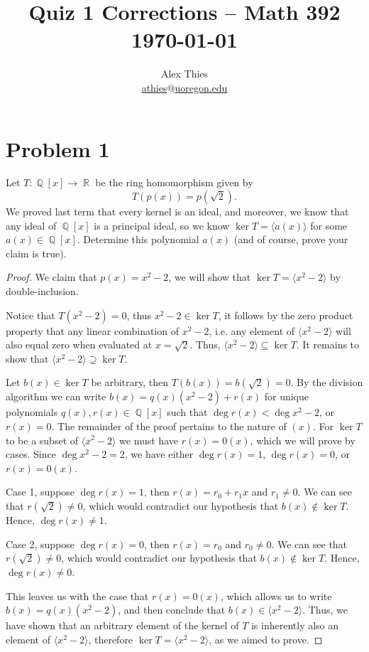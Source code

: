 \documentclass[letterpaper, 12pt]{amsart}
\DeclareMathOperator{\Q}{\mathbb{Q}}
\DeclareMathOperator{\R}{\mathbb{R}}
\newcommand{\pid}[1]{\langle #1 \rangle}
\begin{document}
	\title{Quiz 1 Corrections  -- Math 392 \\ \today}
	\author{Alex Thies \\ \href{mailto:athies@uoregon.edu}{\lowercase{athies$@$uoregon.edu}}}

	\maketitle

	\section*{Problem 1}
	\label{sec:problem_1}
	Let $T : \Q[x] \to \R$ be the ring homomorphism given by $$T(p(x)) = p(\sqrt{2}).$$
	We proved last term that every kernel is an ideal, and moreover, we know that any ideal of $\Q[x]$ is a principal ideal, so we know $\ker{T} = \pid{a(x)}$ for some $a(x) \in \Q[x]$.
	Determine this polynomial $a(x)$ (and of course, prove your claim is true).

	\begin{proof}
	We claim that $p(x) = x^{2} - 2$, we will show that $\ker{T} = \pid{x^{2} - 2}$ by double-inclusion.

	Notice that $T(x^{2} - 2) = 0$, thus $x^{2} - 2 \in \ker{T}$, it follows by the zero product property that any linear combination of $x^{2} - 2$, i.e. any element of $\pid{x^{2} - 2}$ will also equal zero when evaluated at $x = \sqrt{2}$.
	Thus, $\pid{x^{2} - 2} \subseteq \ker{T}$.
	It remains to show that $\pid{x^{2} - 2} \supseteq \ker{T}$.

	Let $b(x) \in \ker{T}$ be arbitrary, then $T(b(x)) = b(\sqrt{2}) = 0$.
	By the division algorithm we can write $b(x) = q(x)(x^{2} - 2) + r(x)$ for unique polynomials $q(x), r(x) \in \Q[x]$ such that $\deg{r(x)} < \deg{x^{2} - 2}$, or $r(x) = 0$.
	The remainder of the proof pertains to the nature of $(x)$.
	For $\ker{T}$ to be a subset of $\pid{x^{2} - 2}$ we must have $r(x) = 0(x)$, which we will prove by cases.
	Since $\deg{x^{2} - 2} = 2$, we have either $\deg{r(x)} = 1$, $\deg{r(x)} = 0$, or $r(x) = 0(x)$.

	Case 1, suppose $\deg{r(x)} = 1$, then $r(x) = r_{0} + r_{1}x$ and $r_{1} \neq 0$.
	We can see that $r(\sqrt{2}) \neq 0$, which would contradict our hypothesis that $b(x) \notin \ker{T}$.
	Hence, $\deg{r(x)} \neq 1$.

	Case 2, suppose $\deg{r(x)} = 0$, then $r(x) = r_{0}$ and $r_{0} \neq 0$.
	We can see that $r(\sqrt{2}) \neq 0$, which would contradict our hypothesis that $b(x) \notin \ker{T}$.
	Hence, $\deg{r(x)} \neq 0$.

	This leaves us with the case that $r(x) = 0(x)$, which allows us to write $b(x) = q(x)(x^{2} - 2)$, and then conclude that $b(x) \in \pid{x^{2} - 2}$.
	Thus, we have shown that an arbitrary element of the kernel of $T$ is inherently also an element of $\pid{x^{2} - 2}$, therefore $\ker{T} = \pid{x^{2} - 2}$, as we aimed to prove.
	\end{proof}
\end{document}

